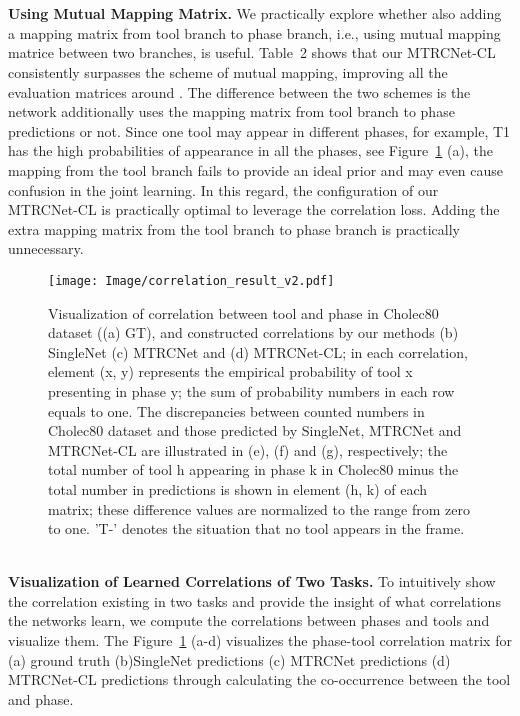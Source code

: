 \documentclass{elsarticle}
\begin{document}
\\
\\
\textbf{Using Mutual Mapping Matrix.}
We practically explore whether also adding a mapping matrix from tool branch to phase branch, i.e., using mutual mapping matrice between two branches, is useful.
Table~2 shows that our MTRCNet-CL consistently surpasses the scheme of mutual mapping, improving all the evaluation matrices around .
The difference between the two schemes is the network additionally uses the mapping matrix from tool branch to phase predictions or not.
Since one tool may appear in different phases, for example, T1 has the high probabilities of appearance in all the phases, see Figure~\ref{fig:correlation} (a),
the mapping from the tool branch fails to provide an ideal prior and may even cause confusion in the joint learning.
In this regard, the configuration of our MTRCNet-CL is practically optimal to leverage the correlation loss.
Adding the extra mapping matrix from the tool branch to phase branch is practically unnecessary.
\\
\begin{figure}[t]
	\color{blue}
	\centering
	\texttt{[image: Image/correlation\_result\_v2.pdf]}
	\caption{
		Visualization of correlation between tool and phase in Cholec80 dataset ((a) GT), and constructed correlations by our methods (b) SingleNet (c) MTRCNet and (d) MTRCNet-CL; in each correlation, element (x, y) represents the empirical probability of tool x presenting in phase y; the sum of probability numbers in each row equals to one. 
		The discrepancies between counted numbers in Cholec80 dataset and those predicted by SingleNet, MTRCNet and MTRCNet-CL are illustrated in (e), (f) and (g), respectively; the total number of tool h appearing in phase k in Cholec80 minus the total number in predictions is shown in element (h, k) of each matrix; these difference values are normalized to the range from zero to one. 
		'T-' denotes the situation that no tool appears in the frame. }
	\label{fig:correlation}
\end{figure}
\\
\textbf{Visualization of Learned Correlations of Two Tasks.}
To intuitively show the correlation existing in two tasks and provide the insight of what correlations the networks learn,
we compute the correlations between phases and tools and visualize them.
The Figure~\ref{fig:correlation} (a-d) visualizes the phase-tool correlation matrix for (a) ground truth (b)SingleNet predictions (c) MTRCNet predictions (d) MTRCNet-CL predictions through calculating the co-occurrence between the tool and phase.
\end{document}
